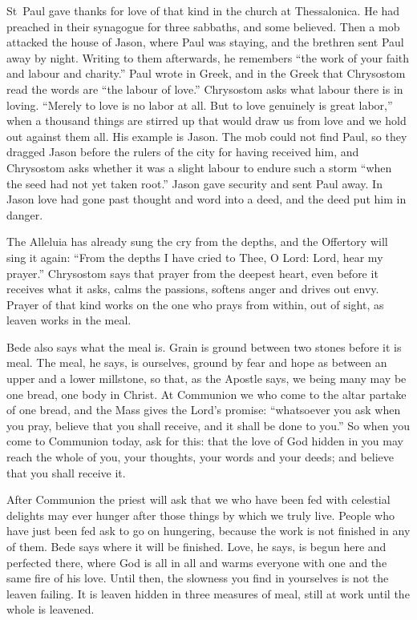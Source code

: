 St~Paul gave thanks for love of that kind in the church at Thessalonica. He
had preached in their synagogue for three sabbaths, and some believed. Then a
mob attacked the house of Jason, where Paul was staying, and the brethren sent
Paul away by night. Writing to them afterwards, he remembers ``the work of
your faith and labour and charity.'' Paul wrote in Greek, and in the Greek
that Chrysostom read the words are ``the labour of love.'' Chrysostom asks
what labour there is in loving. ``Merely to love is no labor at all. But to
love genuinely is great labor,'' when a thousand things are stirred up that
would draw us from love and we hold out against them all. His example is
Jason. The mob could not find Paul, so they dragged Jason before the rulers of
the city for having received him, and Chrysostom asks whether it was a slight
labour to endure such a storm ``when the seed had not yet taken root.'' Jason
gave security and sent Paul away. In Jason love had gone past thought and word
into a deed, and the deed put him in danger.

The Alleluia has already sung the cry from the depths, and the Offertory will
sing it again: ``From the depths I have cried to Thee, O Lord: Lord, hear my
prayer.'' Chrysostom says that prayer from the deepest heart, even before it
receives what it asks, calms the passions, softens anger and drives out envy.
Prayer of that kind works on the one who prays from within, out of sight, as
leaven works in the meal.

Bede also says what the meal is. Grain is ground between two stones before it
is meal. The meal, he says, is ourselves, ground by fear and hope as between
an upper and a lower millstone, so that, as the Apostle says, we being many
may be one bread, one body in Christ. At Communion we who come to the altar
partake of one bread, and the Mass gives the Lord's promise: ``whatsoever you
ask when you pray, believe that you shall receive, and it shall be done to
you.'' So when you come to Communion today, ask for this: that the love of God
hidden in you may reach the whole of you, your thoughts, your words and your
deeds; and believe that you shall receive it.

After Communion the priest will ask that we who have been fed with celestial
delights may ever hunger after those things by which we truly live. People who
have just been fed ask to go on hungering, because the work is not finished in
any of them. Bede says where it will be finished. Love, he says, is begun here
and perfected there, where God is all in all and warms everyone with one and
the same fire of his love. Until then, the slowness you find in yourselves is
not the leaven failing. It is leaven hidden in three measures of meal, still
at work until the whole is leavened.
